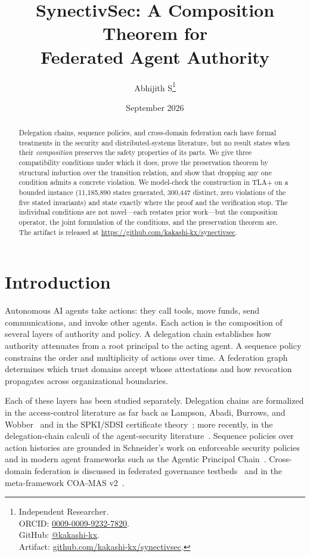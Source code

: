 \documentclass[11pt,a4paper]{article}
\title{SynectivSec: A Composition Theorem for\\Federated Agent Authority}
\author{
  Abhijith S\thanks{%
    Independent Researcher.\\
    ORCID: \href{https://orcid.org/0009-0009-9232-7820}{0009-0009-9232-7820}.\\
    GitHub: \href{https://github.com/kakashi-kx}{@kakashi-kx}.\\
    Artifact: \href{https://github.com/kakashi-kx/synectivsec}{github.com/kakashi-kx/synectivsec}.
  }
}
\date{September 2026}
\theoremstyle{plain}
\theoremstyle{definition}
\theoremstyle{remark}
\begin{document}
\maketitle

\begin{abstract}
Delegation chains, sequence policies, and cross-domain federation each have
formal treatments in the security and distributed-systems literature, but no
result states when their \emph{composition} preserves the safety properties of
its parts. We give three compatibility conditions under which it does, prove
the preservation theorem by structural induction over the transition relation,
and show that dropping any one condition admits a concrete violation. We
model-check the construction in TLA+ on a bounded instance
(11{,}185{,}890 states generated, 300{,}447 distinct, zero violations of the
five stated invariants) and state exactly where the proof and the verification
stop. The individual conditions are not novel---each restates prior work---but
the composition operator, the joint formulation of the conditions, and the
preservation theorem are. The artifact is released at
\url{https://github.com/kakashi-kx/synectivsec}.
\end{abstract}

\section{Introduction}
\label{sec:intro}

Autonomous AI agents take actions: they call tools, move funds, send
communications, and invoke other agents. Each action is the composition of
several layers of authority and policy. A delegation chain establishes how
authority attenuates from a root principal to the acting agent. A sequence
policy constrains the order and multiplicity of actions over time. A
federation graph determines which trust domains accept whose attestations and
how revocation propagates across organizational boundaries.

Each of these layers has been studied separately. Delegation chains are
formalized in the access-control literature as far back as Lampson, Abadi,
Burrows, and Wobber~\cite{lampson1992authentication} and in the SPKI/SDSI
certificate theory~\cite{rfc2693spki}; more recently, in the delegation-chain
calculi of the agent-security literature~\cite{sentinelagent2026}. Sequence
policies over action histories are grounded in
Schneider's work on enforceable security policies~\cite{schneider2000enforceable}
and in modern agent frameworks such as the Agentic Principal
Chain~\cite{boundedagents2026}. Cross-domain federation is discussed in
federated governance testbeds~\cite{wang2026federated} and in the meta-framework
COA-MAS v2~\cite{coamas2026}.
\end{document}
